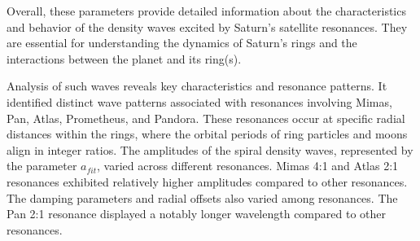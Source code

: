 \documentclass{article}
\begin{document}
Overall, these parameters provide detailed information about the characteristics and behavior of the density waves excited by Saturn's satellite resonances. They are essential for understanding the dynamics of Saturn's rings and the interactions between the planet and its ring(s).

Analysis of such waves reveals key characteristics and resonance patterns. It identified distinct wave patterns associated with resonances involving Mimas, Pan, Atlas, Prometheus, and Pandora. These resonances occur at specific radial distances within the rings, where the orbital periods of ring particles and moons align in integer ratios. The amplitudes of the spiral density waves, represented by the parameter $a_{fit}$, varied across different resonances. Mimas 4:1 and Atlas 2:1 resonances exhibited relatively higher amplitudes compared to other resonances. The damping parameters and radial offsets also varied among resonances. The Pan 2:1 resonance displayed a notably longer wavelength compared to other resonances.

\end{document}
